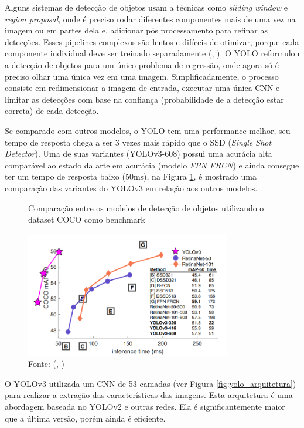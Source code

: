 \documentclass[]{politex}
\begin{document}
Alguns sistemas de detecção de objetos usam a técnicas como \textit{sliding window} e \textit{region proposal}, onde é preciso rodar diferentes componentes mais de uma vez na imagem ou em partes dela e, adicionar pós processamento para refinar as detecções. Esses pipelines complexos são lentos e difíceis de otimizar, porque cada componente individual deve ser treinado separadamente (, \citeyear{yolov1}). O YOLO reformulou a detecção de objetos para um único problema de regressão, onde agora só é preciso olhar uma única vez em uma imagem. Simplificadamente, o processo consiste em redimensionar a imagem de entrada, executar uma única CNN e limitar as detecções com base na confiança (probabilidade de a detecção estar correta) de cada detecção.

Se comparado com outros modelos, o YOLO tem uma performance melhor, seu tempo de resposta chega a ser 3 vezes mais rápido que o SSD (\textit{Single Shot Detector}). Uma de suas variantes (YOLOv3-608) possui uma acurácia alta comparável ao estado da arte em acurácia (modelo \textit{FPN FRCN}) e ainda consegue ter um tempo de resposta baixo (50ms), na Figura \ref{fig:yolo_comparacao}, é mostrado uma comparação das variantes do YOLOv3 em relação aos outros modelos.

\begin{figure}[H]
    \centering
    \caption{Comparação entre os modelos de detecção de objetos utilizando o dataset COCO como benchmark}
    \includegraphics[width=0.8\textwidth]{yolov3_comparacao}
    \caption*{Fonte: (, \citeyear{yolov3})}
    \label{fig:yolo_comparacao}
\end{figure}

O YOLOv3 utilizada um CNN de 53 camadas (ver Figura \ref{fig:yolo_arquitetura}) para realizar a extração das características das imagens. Esta arquitetura é uma abordagem baseada no YOLOv2 e outras redes. Ela é significantemente maior que a última versão, porém ainda é eficiente.
\end{document}
